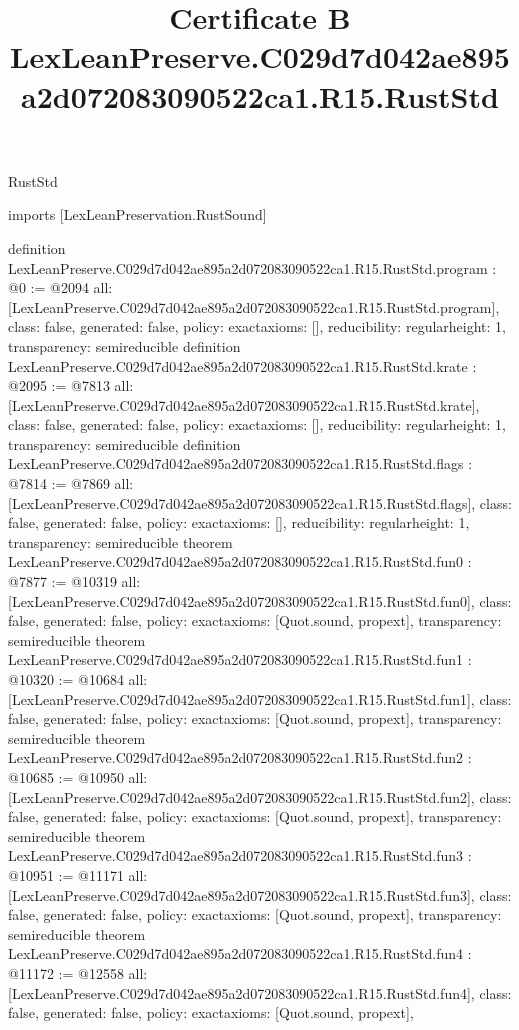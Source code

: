 \begin{lexlean}{RustStd}
\title{Certificate B LexLeanPreserve.C029d7d042ae895a2d072083090522ca1.R15.RustStd}
\begin{coremodule}
imports [LexLeanPreservation.RustSound]

definition LexLeanPreserve.C029d7d042ae895a2d072083090522ca1.R15.RustStd.program : @0 := @2094 {
  all: [LexLeanPreserve.C029d7d042ae895a2d072083090522ca1.R15.RustStd.program],
  class: false,
  generated: false,
  policy: exact{axioms: []},
  reducibility: regular{height: 1},
  transparency: semireducible
}
definition LexLeanPreserve.C029d7d042ae895a2d072083090522ca1.R15.RustStd.krate : @2095 := @7813 {
  all: [LexLeanPreserve.C029d7d042ae895a2d072083090522ca1.R15.RustStd.krate],
  class: false,
  generated: false,
  policy: exact{axioms: []},
  reducibility: regular{height: 1},
  transparency: semireducible
}
definition LexLeanPreserve.C029d7d042ae895a2d072083090522ca1.R15.RustStd.flags : @7814 := @7869 {
  all: [LexLeanPreserve.C029d7d042ae895a2d072083090522ca1.R15.RustStd.flags],
  class: false,
  generated: false,
  policy: exact{axioms: []},
  reducibility: regular{height: 1},
  transparency: semireducible
}
theorem LexLeanPreserve.C029d7d042ae895a2d072083090522ca1.R15.RustStd.fun0 : @7877 := @10319 {
  all: [LexLeanPreserve.C029d7d042ae895a2d072083090522ca1.R15.RustStd.fun0],
  class: false,
  generated: false,
  policy: exact{axioms: [Quot.sound, propext]},
  transparency: semireducible
}
theorem LexLeanPreserve.C029d7d042ae895a2d072083090522ca1.R15.RustStd.fun1 : @10320 := @10684 {
  all: [LexLeanPreserve.C029d7d042ae895a2d072083090522ca1.R15.RustStd.fun1],
  class: false,
  generated: false,
  policy: exact{axioms: [Quot.sound, propext]},
  transparency: semireducible
}
theorem LexLeanPreserve.C029d7d042ae895a2d072083090522ca1.R15.RustStd.fun2 : @10685 := @10950 {
  all: [LexLeanPreserve.C029d7d042ae895a2d072083090522ca1.R15.RustStd.fun2],
  class: false,
  generated: false,
  policy: exact{axioms: [Quot.sound, propext]},
  transparency: semireducible
}
theorem LexLeanPreserve.C029d7d042ae895a2d072083090522ca1.R15.RustStd.fun3 : @10951 := @11171 {
  all: [LexLeanPreserve.C029d7d042ae895a2d072083090522ca1.R15.RustStd.fun3],
  class: false,
  generated: false,
  policy: exact{axioms: [Quot.sound, propext]},
  transparency: semireducible
}
theorem LexLeanPreserve.C029d7d042ae895a2d072083090522ca1.R15.RustStd.fun4 : @11172 := @12558 {
  all: [LexLeanPreserve.C029d7d042ae895a2d072083090522ca1.R15.RustStd.fun4],
  class: false,
  generated: false,
  policy: exact{axioms: [Quot.sound, propext]},
}
\end{coremodule}
\end{lexlean}

